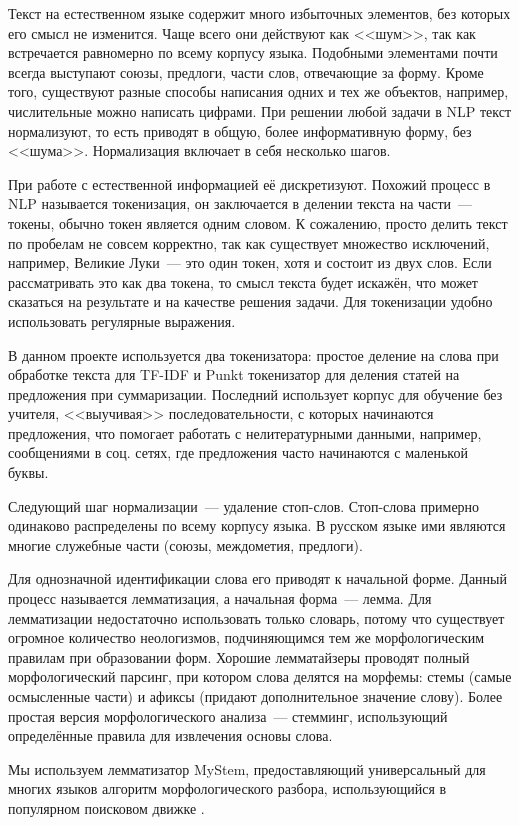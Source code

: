 \documentclass[a4paper, 14pt]{extarticle}
\begin{document}
Текст на естественном языке содержит много избыточных элементов, без которых его смысл не изменится. Чаще всего они действуют как <<шум>>, так как встречается равномерно по всему корпусу языка. Подобными элементами почти всегда выступают союзы, предлоги, части слов, отвечающие за форму. Кроме того, существуют разные способы написания одних и тех же объектов, например, числительные можно написать цифрами. При решении любой задачи в NLP текст нормализуют, то есть приводят в общую, более информативную форму, без <<шума>>. Нормализация включает в себя несколько шагов.

При работе с естественной информацией её дискретизуют. Похожий процесс в NLP называется токенизация, он заключается в делении текста на части~--- токены, обычно токен является одним словом. К сожалению, просто делить текст по пробелам не совсем корректно, так как существует множество исключений, например, Великие Луки~--- это один токен, хотя и состоит из двух слов. Если рассматривать это как два токена, то смысл текста будет искажён, что может сказаться на результате и на качестве решения задачи. Для токенизации удобно использовать регулярные выражения.

В данном проекте используется два токенизатора: простое деление на слова при обработке текста для TF-IDF и Punkt токенизатор для деления статей на предложения при суммаризации. Последний использует корпус для обучение без учителя, <<выучивая>> последовательности, с которых начинаются предложения, что помогает работать с нелитературными данными, например, сообщениями в соц. сетях, где предложения часто начинаются с маленькой буквы.

Следующий шаг нормализации~--- удаление стоп-слов. Стоп-слова примерно одинаково распределены по всему корпусу языка. В русском языке ими являются многие служебные части (союзы, междометия, предлоги).

Для однозначной идентификации слова его приводят к начальной форме. Данный процесс называется лемматизация, а начальная форма~--- лемма. Для лемматизации недостаточно использовать только словарь, потому что существует огромное количество неологизмов, подчиняющимся тем же морфологическим правилам при образовании форм. Хорошие лемматайзеры проводят полный морфологический парсинг, при котором слова делятся на морфемы: стемы (самые осмысленные части) и афиксы (придают дополнительное значение слову). Более простая версия морфологического анализа~--- стемминг, использующий определённые правила для извлечения основы слова.

Мы используем лемматизатор MyStem, предоставляющий универсальный для многих языков алгоритм морфологического разбора, использующийся в популярном поисковом движке \cite{pystem}.
\end{document}
